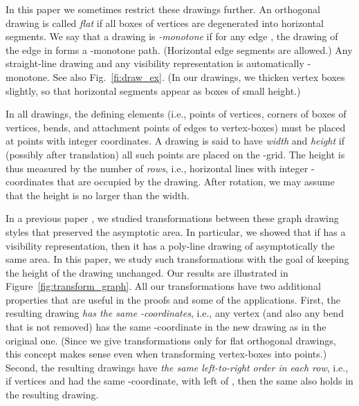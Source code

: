 \documentclass{elsarticle}
\begin{document}
In this paper we sometimes restrict these drawings further.
An orthogonal drawing is called
{\em flat} if all boxes of vertices are degenerated into horizontal
segments.
We say that a drawing  is {\em -monotone} if for any edge
, the drawing of the edge in  forms a -monotone
path.  (Horizontal edge segments are allowed.)
Any straight-line drawing
and any visibility representation is automatically -monotone.
See also Fig.~\ref{fi:draw_ex}.  (In our drawings, we thicken vertex boxes
slightly, so that horizontal segments appear as boxes of small height.)

\iffalse
\begin{figure}[ht]
\hspace*{\fill}

\hspace*{\fill}

\hspace*{\fill}

\hspace*{\fill}

\hspace*{\fill}
\caption{The same graph in a straight-line drawing, a -monotone
poly-line drawing,
a flat -monotone orthogonal drawing, and a flat visibility representation.}
\label{fi:draw_ex}
\end{figure}
\fi

In all drawings, the defining elements (i.e.,
points of vertices, corners of boxes of vertices, bends, and attachment points
of edges to vertex-boxes) must be placed
at points with integer coordinates.  A drawing is said to have
{\em width } and {\em height } if (possibly after translation)
all such points are placed on the -grid.  
The height is thus measured by the number of {\em rows}, 
i.e., horizontal lines with integer -coordinates that are occupied by the 
drawing.  After rotation, we may assume that the height is no larger
than the width.

In a previous paper \cite{Bie-DCG11}, we studied transformations
between these graph drawing styles that preserved the asymptotic
area.  In particular, we showed that if  has a visibility
representation, then it has a poly-line drawing of asymptotically
the same area.  In this paper, we study such
transformations with the goal of keeping
the height of the drawing unchanged.
Our results are illustrated in Figure~\ref{fig:transform_graph}.
All our transformations have two additional properties that 
are useful in the proofs and 
some of the applications.  First, the resulting drawing
{\em has the same
 -coordinates}, i.e., any vertex (and also any bend that is
not removed) has the same -coordinate in
the new drawing as in the original one.  (Since we give transformations
only for flat orthogonal drawings, this concept makes sense even when
transforming vertex-boxes into points.) Second, the resulting drawings
have {\em the same left-to-right order in each row}, i.e., if 
vertices  and 
had the same -coordinate, with  left of , then the same
also holds in the resulting drawing.
\end{document}
